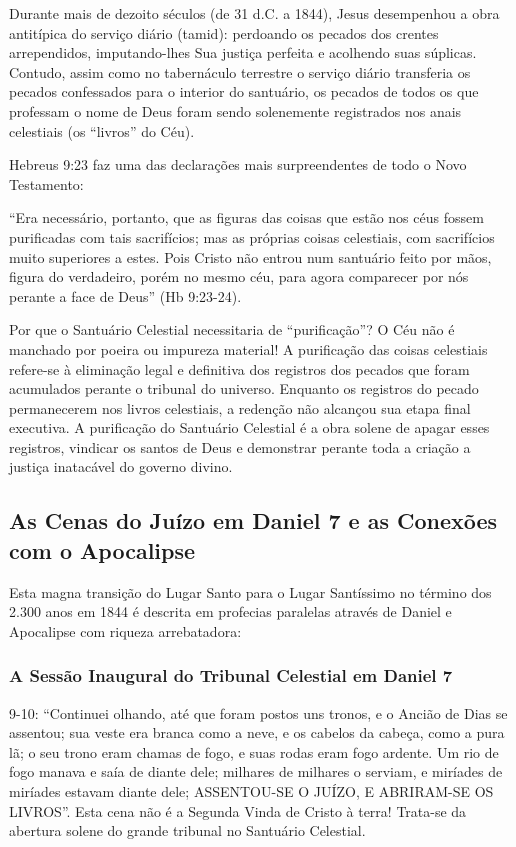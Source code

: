 Durante mais de dezoito séculos (de 31 d.C. a 1844), Jesus desempenhou a obra antitípica do serviço diário (tamid): perdoando os pecados dos crentes arrependidos, imputando-lhes Sua justiça perfeita e acolhendo suas súplicas. Contudo, assim como no tabernáculo terrestre o serviço diário transferia os pecados confessados para o interior do santuário, os pecados de todos os que professam o nome de Deus foram sendo solenemente registrados nos anais celestiais (os ``livros'' do Céu).

Hebreus 9:23 faz uma das declarações mais surpreendentes de todo o Novo Testamento:

``Era necessário, portanto, que as figuras das coisas que estão nos céus fossem purificadas com tais sacrifícios; mas as próprias coisas celestiais, com sacrifícios muito superiores a estes. Pois Cristo não entrou num santuário feito por mãos, figura do verdadeiro, porém no mesmo céu, para agora comparecer por nós perante a face de Deus'' (Hb 9:23-24).

Por que o Santuário Celestial necessitaria de ``purificação''? O Céu não é manchado por poeira ou impureza material! A purificação das coisas celestiais refere-se à eliminação legal e definitiva dos registros dos pecados que foram acumulados perante o tribunal do universo. Enquanto os registros do pecado permanecerem nos livros celestiais, a redenção não alcançou sua etapa final executiva. A purificação do Santuário Celestial é a obra solene de apagar esses registros, vindicar os santos de Deus e demonstrar perante toda a criação a justiça inatacável do governo divino.



\subsection{As Cenas do Juízo em Daniel 7 e as Conexões com o Apocalipse}


Esta magna transição do Lugar Santo para o Lugar Santíssimo no término dos 2.300 anos em 1844 é descrita em profecias paralelas através de Daniel e Apocalipse com riqueza arrebatadora:


\subsubsection*{A Sessão Inaugural do Tribunal Celestial em Daniel 7}
9-10:
``Continuei olhando, até que foram postos uns tronos, e o Ancião de Dias se assentou; sua veste era branca como a neve, e os cabelos da cabeça, como a pura lã; o seu trono eram chamas de fogo, e suas rodas eram fogo ardente. Um rio de fogo manava e saía de diante dele; milhares de milhares o serviam, e miríades de miríades estavam diante dele; ASSENTOU-SE O JUÍZO, E ABRIRAM-SE OS LIVROS''.
Esta cena não é a Segunda Vinda de Cristo à terra! Trata-se da abertura solene do grande tribunal no Santuário Celestial.


